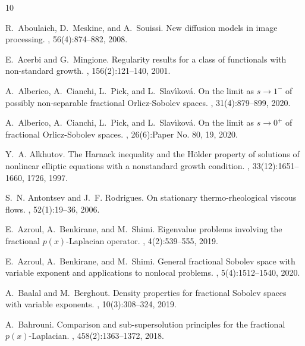 \documentclass[11pt]{amsart}
\theoremstyle{plain}
\theoremstyle{definition}
\numberwithin{equation}{section}
\begin{document}

\begin{thebibliography}{10}

R.~Aboulaich, D.~Meskine, and A.~Souissi.
\newblock New diffusion models in image processing.
, 56(4):874--882, 2008.

E.~Acerbi and G.~Mingione.
\newblock Regularity results for a class of functionals with non-standard
  growth.
, 156(2):121--140, 2001.

A.~Alberico, A.~Cianchi, L.~Pick, and L.~Slav\'{\i}kov\'{a}.
\newblock On the limit as {$s \to 1^-$} of possibly non-separable fractional
  {O}rlicz-{S}obolev spaces.
,
  31(4):879--899, 2020.

A.~Alberico, A.~Cianchi, L.~Pick, and L.~Slav\'{\i}kov\'{a}.
\newblock On the limit as {$s\to 0^+$} of fractional {O}rlicz-{S}obolev spaces.
, 26(6):Paper No. 80, 19, 2020.

Y.~A. Alkhutov.
\newblock The {H}arnack inequality and the {H}\"{o}lder property of solutions
  of nonlinear elliptic equations with a nonstandard growth condition.
, 33(12):1651--1660, 1726, 1997.

S.~N. Antontsev and J.~F. Rodrigues.
\newblock On stationary thermo-rheological viscous flows.
, 52(1):19--36, 2006.

E.~Azroul, A.~Benkirane, and M.~Shimi.
\newblock Eigenvalue problems involving the fractional {$p(x)$}-{L}aplacian
  operator.
, 4(2):539--555, 2019.

E.~Azroul, A.~Benkirane, and M.~Shimi.
\newblock General fractional {S}obolev space with variable exponent and
  applications to nonlocal problems.
, 5(4):1512--1540, 2020.

A.~Baalal and M.~Berghout.
\newblock Density properties for fractional {S}obolev spaces with variable
  exponents.
, 10(3):308--324, 2019.

A.~Bahrouni.
\newblock Comparison and sub-supersolution principles for the fractional
  {$p(x)$}-{L}aplacian.
, 458(2):1363--1372, 2018.


\end{thebibliography}
\end{document}
